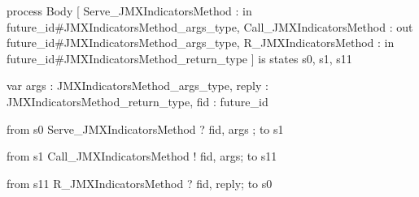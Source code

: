 process Body  [ Serve_JMXIndicatorsMethod : in future_id#JMXIndicatorsMethod_args_type,
 Call_JMXIndicatorsMethod  : out future_id#JMXIndicatorsMethod_args_type, 
 R_JMXIndicatorsMethod     : in future_id#JMXIndicatorsMethod_return_type   ] is
	states s0, s1, s11			

	var args  : JMXIndicatorsMethod_args_type,	
		reply : JMXIndicatorsMethod_return_type,
		fid   : future_id           
	
	from s0 
	   Serve_JMXIndicatorsMethod ? fid, args ; to s1
	
	from s1
	   Call_JMXIndicatorsMethod ! fid, args; to s11
	   
	from s11
	   R_JMXIndicatorsMethod ? fid, reply; to s0